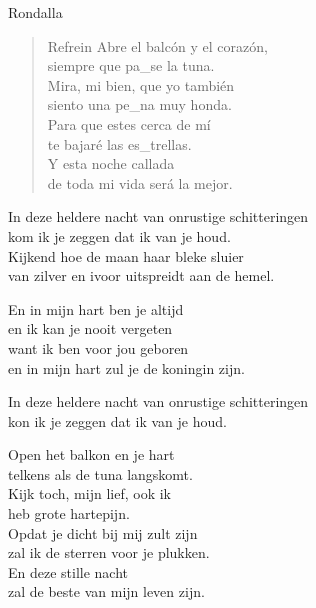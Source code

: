 \begin{song}[vals]{Rondalla}
\begin{verse}{Refrein}
Abre el balcón y el corazón,\\
siempre que \chord{}pa\_se \chord{-}\hspace{1em}\chord{}\hspace{1em} la tuna.\\
\chord{}Mira, mi bien, que yo tambi\'{e}n\\
siento una \chord{}pe\_\chord{}na\chord{-} \hspace{1em}\hspace{1em} muy honda.\\
\chord{}Para que estes cerca de m\'{i}\\
te bajar\'{e} las es\_trellas.\\
Y esta noche callada\\
de toda mi vida ser\'{a} la mejor.\hspace{4em} 
\end{verse}

\end{song}

\clearpage
\begin{translation}
In deze heldere nacht van onrustige schitteringen\\
kom ik je zeggen dat ik van je houd.\\
Kijkend hoe de maan haar bleke sluier\\
van zilver en ivoor uitspreidt aan de hemel.\vspace{\wlskip}

En in mijn hart ben je altijd\\
en ik kan je nooit vergeten\\
want ik ben voor jou geboren\\
en in mijn hart zul je de koningin zijn.\vspace{\wlskip}

In deze heldere nacht van onrustige schitteringen\\
kon ik je zeggen dat ik van je houd.\vspace{\wlskip}

Open het balkon en je hart\\
telkens als de tuna langskomt.\\
Kijk toch, mijn lief, ook ik\\
heb grote hartepijn.\\
Opdat je dicht bij mij zult zijn\\
zal ik de sterren voor je plukken.\\
En deze stille nacht\\
zal de beste van mijn leven zijn.
\end{translation}
